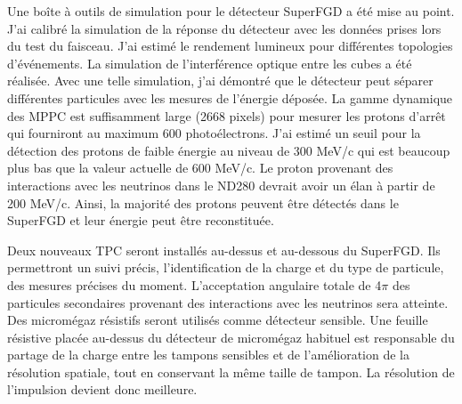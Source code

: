 \documentclass[../main.tex]{subfiles}
\begin{document}

Une boîte à outils de simulation pour le détecteur SuperFGD a été mise au point. J'ai calibré la simulation de la réponse du détecteur avec les données prises lors du test du faisceau. J'ai estimé le rendement lumineux pour différentes topologies d'événements. La simulation de l'interférence optique entre les cubes a été réalisée. Avec une telle simulation, j'ai démontré que le détecteur peut séparer différentes particules avec les mesures de l'énergie déposée. La gamme dynamique des MPPC est suffisamment large (2668 pixels) pour mesurer les protons d'arrêt qui fourniront au maximum 600 photoélectrons. J'ai estimé un seuil pour la détection des protons de faible énergie au niveau de 300 MeV/c qui est beaucoup plus bas que la valeur actuelle de 600 MeV/c. Le proton provenant des interactions avec les neutrinos dans le ND280 devrait avoir un élan à partir de 200 MeV/c. Ainsi, la majorité des protons peuvent être détectés dans le SuperFGD et leur énergie peut être reconstituée.


Deux nouveaux TPC seront installés au-dessus et au-dessous du SuperFGD. Ils permettront un suivi précis, l'identification de la charge et du type de particule, des mesures précises du moment. L'acceptation angulaire totale de 4$\pi$ des particules secondaires provenant des interactions avec les neutrinos sera atteinte. Des micromégaz résistifs seront utilisés comme détecteur sensible. Une feuille résistive placée au-dessus du détecteur de micromégaz habituel est responsable du partage de la charge entre les tampons sensibles et de l'amélioration de la résolution spatiale, tout en conservant la même taille de tampon. La résolution de l'impulsion devient donc meilleure.
\end{document}
